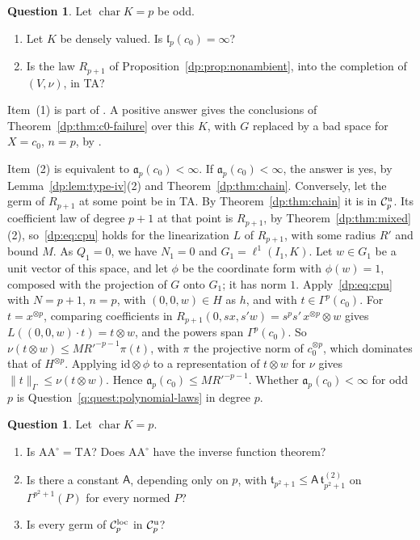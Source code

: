 \documentclass[11pt]{amsart}
\theoremstyle{definition}
\theoremstyle{remark}
\numberwithin{equation}{section}
\newcommand{\id}{\mathrm{id}}
\newcommand{\norm}[1]{\lVert #1\rVert}
\newcommand{\cC}{\mathcal{C}}
\theoremstyle{plain}
\theoremstyle{definition}
\newtheorem{question}[theorem]{Question}
\theoremstyle{plain}
\begin{document}
\begin{question}\label{dp:q:odd-c0}
Let $\operatorname{char}K=p$ be odd.
\begin{enumerate}
\item Let $K$ be densely valued. Is $\mathfrak l_p(c_0)=\infty$?
\item Is the law $R_{p+1}$ of Proposition~\ref{dp:prop:nonambient}, into the completion of $(V,\nu)$, in TA?
\end{enumerate}
\end{question}

Item~(1) is part of \cite[Question~14.42(2)]{I}. A positive answer gives the conclusions of Theorem~\ref{dp:thm:c0-failure} over this $K$, with $G$ replaced by a bad space for $X=c_0$, $n=p$, by \cite[Proposition~14.18]{I}.

Item~(2) is equivalent to $\mathfrak a_p(c_0)<\infty$. If $\mathfrak a_p(c_0)<\infty$, the answer is yes, by Lemma~\ref{dp:lem:type-iv}(2) and Theorem~\ref{dp:thm:chain}. Conversely, let the germ of $R_{p+1}$ at some point be in TA. By Theorem~\ref{dp:thm:chain} it is in $\cC_p^{\rm u}$. Its coefficient law of degree $p+1$ at that point is $R_{p+1}$, by Theorem~\ref{dp:thm:mixed}(2), so~\eqref{dp:eq:cpu} holds for the linearization $L$ of $R_{p+1}$, with some radius $R'$ and bound $M$. As $Q_1=0$, we have $N_1=0$ and $G_1=\ell^1(I_1,K)$. Let $w\in G_1$ be a unit vector of this space, and let $\phi$ be the coordinate form with $\phi(w)=1$, composed with the projection of $G$ onto $G_1$; it has norm $1$. Apply~\eqref{dp:eq:cpu} with $N=p+1$, $n=p$, with $(0,0,w)\in H$ as $h$, and with $t\in\Gamma^p(c_0)$. For $t=x^{\otimes p}$, comparing coefficients in $R_{p+1}(0,sx,s'w)=s^ps'\,x^{\otimes p}\otimes w$ gives $L((0,0,w)\cdot t)=t\otimes w$, and the powers span $\Gamma^p(c_0)$. So $\nu(t\otimes w)\le MR'^{-p-1}\pi(t)$, with $\pi$ the projective norm of $c_0^{\otimes p}$, which dominates that of $H^{\otimes p}$. Applying $\id\otimes\phi$ to a representation of $t\otimes w$ for $\nu$ gives $\norm t_\Gamma\le\nu(t\otimes w)$. Hence $\mathfrak a_p(c_0)\le MR'^{-p-1}$. Whether $\mathfrak a_p(c_0)<\infty$ for odd $p$ is Question~\ref{q:quest:polynomial-laws} in degree $p$.

\begin{question}\label{dp:q:ta}
Let $\operatorname{char}K=p$.
\begin{enumerate}
\item Is $\mathrm{AA}^\circ=\mathrm{TA}$? Does $\mathrm{AA}^\circ$ have the inverse function theorem?
\item Is there a constant $\mathsf A$, depending only on $p$, with $\mathfrak t_{p^2+1}\le\mathsf A\,\mathfrak t^{(2)}_{p^2+1}$ on $\Gamma^{p^2+1}(P)$ for every normed $P$?
\item Is every germ of $\cC_p^{\rm loc}$ in $\cC_p^{\rm u}$?
\end{enumerate}
\end{question}
\end{document}
